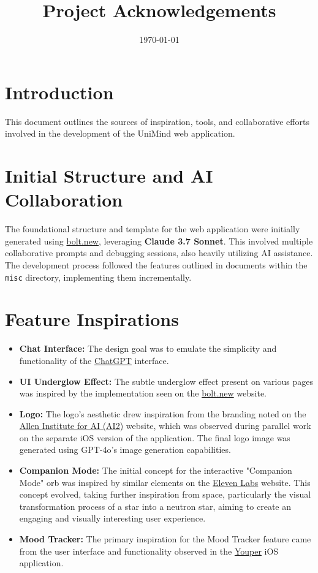\documentclass{article}
\title{Project Acknowledgements}
\author{}
\date{\today}
\begin{document}
\maketitle

\section*{Introduction}
This document outlines the sources of inspiration, tools, and collaborative efforts involved in the development of the UniMind web application.

\section*{Initial Structure and AI Collaboration}
The foundational structure and template for the web application were initially generated using \href{https://bolt.new/}{bolt.new}, leveraging \textbf{Claude 3.7 Sonnet}. This involved multiple collaborative prompts and debugging sessions, also heavily utilizing AI assistance. The development process followed the features outlined in documents within the \texttt{misc} directory, implementing them incrementally.

\section*{Feature Inspirations}
\begin{itemize}
    \item \textbf{Chat Interface:} The design goal was to emulate the simplicity and functionality of the \href{https://chatgpt.com/}{ChatGPT} interface.
    \item \textbf{UI Underglow Effect:} The subtle underglow effect present on various pages was inspired by the implementation seen on the \href{https://bolt.new/}{bolt.new} website.
    \item \textbf{Logo:} The logo's aesthetic drew inspiration from the branding noted on the \href{https://allenai.org/}{Allen Institute for AI (AI2)} website, which was observed during parallel work on the separate iOS version of the application. The final logo image was generated using GPT-4o's image generation capabilities.
    \item \textbf{Companion Mode:} The initial concept for the interactive "Companion Mode" orb was inspired by similar elements on the \href{https://elevenlabs.io/app/conversational-ai/agents}{Eleven Labs} website. This concept evolved, taking further inspiration from space, particularly the visual transformation process of a star into a neutron star, aiming to create an engaging and visually interesting user experience.
    \item \textbf{Mood Tracker:} The primary inspiration for the Mood Tracker feature came from the user interface and functionality observed in the \href{https://www.youper.ai/}{Youper} iOS application.
\end{itemize}
\end{document}
